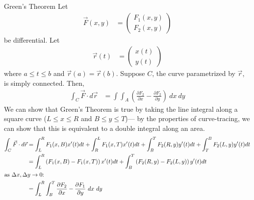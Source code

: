 \documentclass[8pt]{extarticle}
\begin{document}
  \begin{problem}{Green's Theorem}
    Let
    \begin{align*}
      \vec{F}(x,y) &= \begin{pmatrix}F_1(x,y)\\F_2(x,y)\end{pmatrix}
    \end{align*}
    be differential. Let
    \begin{align*}
      \vec{r}(t) &= \begin{pmatrix}x(t)\\y(t)\end{pmatrix}
    \end{align*}
    where $a\leq t \leq b$ and $\vec{r}(a) = \vec{r}(b)$. Suppose $C$, the curve parametrized by $\vec{r}$, is simply connected. Then,
    \begin{align*}
      \int_{C}\vec{F}\cdot d\vec{r} &= \int\int_{A} \left(\frac{\partial F_2}{\partial x} - \frac{\partial F_2}{\partial y}\right)~dx~dy
    \end{align*}
    \tcblower
    We can show that Green's Theorem is true by taking the line integral along a square curve ($L\leq x \leq R$ and $B\leq y\leq T$)--- by the properties of curve-tracing, we can show that this is equivalent to a double integral along an area.
    \begin{align*}
      \int_{C}\vec{F} \cdot d\vec{r} &= \int_{L}^{R}F_1(x,B)x'(t)dt + \int_{R}^{L}F_1(x,T)x'(t)dt + \int_{B}^{T}F_{2}(R,y)y'(t)dt + \int_{T}^{B}F_2(L,y)y'(t)dt\\
                                     &= \int_{L}^{R} \left(F_{1}(x,B) - F_1(x,T)\right)x'(t)dt + \int_{B}^{T}\left(F_{2}(R,y) - F_2(L,y)\right)y'(t)dt\\
                                     \shortintertext{as $\Delta x,\Delta y \rightarrow 0$:}
                                     &= \int_{L}^{R} \int_{B}^{T} \frac{\partial F_2}{\partial x} - \frac{\partial F_1}{\partial y}~dx~dy
    \end{align*}
  \end{problem}
\end{document}

